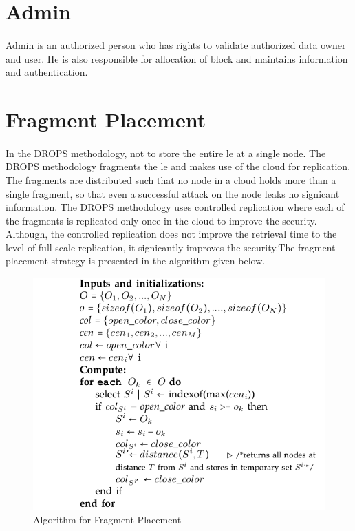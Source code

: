 \section{Admin}
\paragraph*{} 
Admin is an authorized person who has rights to validate authorized data owner
and user. He is also responsible for allocation of block and maintains information and
authentication.
\section{Fragment Placement}
\paragraph*{}
In the DROPS methodology, not to store the entire le at a single node. The DROPS
methodology fragments the le and makes use of the cloud for replication. The fragments
are distributed such that no node in a cloud holds more than a single fragment, so that even
a successful attack on the node leaks no signicant information. The DROPS methodology
uses controlled replication where each of the fragments is replicated only once in the cloud
to improve the security. Although, the controlled replication does not improve the retrieval
time to the level of full-scale replication, it signicantly improves the security.The fragment placement strategy is presented in
the algorithm given below.
\\
\begin{figure}
	\centering
	\includegraphics[scale=0.5]{placementalgo}
	\caption{Algorithm for Fragment Placement}
\end{figure}

